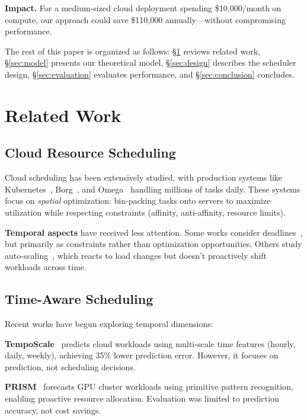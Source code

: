 \documentclass[10pt,conference]{IEEEtran}
\begin{document}
\textbf{Impact.} For a medium-sized cloud deployment spending \$10,000/month on compute, our approach could save \$110,000 annually—without compromising performance.

The rest of this paper is organized as follows: \S\ref{sec:related} reviews related work, \S\ref{sec:model} presents our theoretical model, \S\ref{sec:design} describes the scheduler design, \S\ref{sec:evaluation} evaluates performance, and \S\ref{sec:conclusion} concludes.

\section{Related Work}
\label{sec:related}

\subsection{Cloud Resource Scheduling}

Cloud scheduling has been extensively studied, with production systems like Kubernetes~\cite{kubernetes2025}, Borg~\cite{verma2015large}, and Omega~\cite{tumanov2016omega} handling millions of tasks daily. These systems focus on \textit{spatial} optimization: bin-packing tasks onto servers to maximize utilization while respecting constraints (affinity, anti-affinity, resource limits).

\textbf{Temporal aspects} have received less attention. Some works consider deadlines~\cite{chaudhry2019deadline}, but primarily as constraints rather than optimization opportunities. Others study auto-scaling~\cite{lorido2014review}, which reacts to load changes but doesn't proactively shift workloads across time.

\subsection{Time-Aware Scheduling}

Recent works have begun exploring temporal dimensions:

\textbf{TempoScale}~\cite{wen2024temposcale} predicts cloud workloads using multi-scale time features (hourly, daily, weekly), achieving 35\% lower prediction error. However, it focuses on prediction, not scheduling decisions.

\textbf{PRISM}~\cite{wu2026prism} forecasts GPU cluster workloads using primitive pattern recognition, enabling proactive resource allocation. Evaluation was limited to prediction accuracy, not cost savings.
\end{document}
